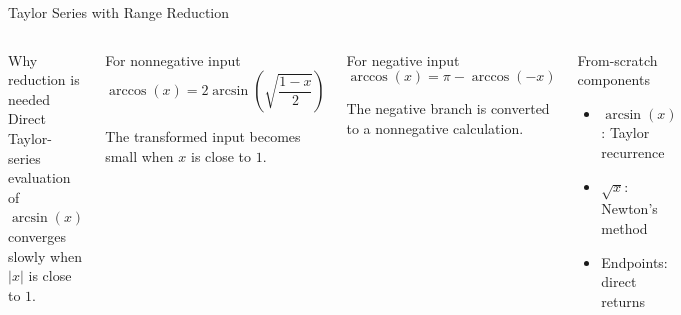 \documentclass[aspectratio=169]{beamer}
\begin{document}
\begin{frame}{Taylor Series with Range Reduction}
\begin{columns}[T,onlytextwidth]

\begin{alertblock}{Why reduction is needed}
Direct Taylor-series evaluation of \(\arcsin(x)\) converges slowly when
\(\lvert x\rvert\) is close to \(1\).
\end{alertblock}

\begin{block}{For nonnegative input}
\[
\arccos(x)=
2\arcsin\left(\sqrt{\frac{1-x}{2}}\right)
\]

The transformed input becomes small when \(x\) is close to \(1\).
\end{block}


\begin{block}{For negative input}
\[
\arccos(x)=\pi-\arccos(-x)
\]

The negative branch is converted to a nonnegative calculation.
\end{block}

\begin{exampleblock}{From-scratch components}
\begin{itemize}
    \item \(\arcsin(x)\): Taylor recurrence
    \item \(\sqrt{x}\): Newton's method
    \item Endpoints: direct returns
\end{itemize}
\end{exampleblock}
\end{columns}

\small\cite{stewart,burden}
\end{frame}
\end{document}
